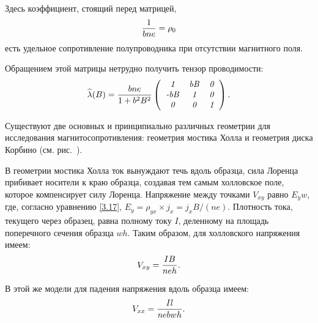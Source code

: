 Здесь коэффициент, стоящий перед матрицей,
\begin{equation}
	\frac{1}{bne} = \rho_0
	\eqmark{UdSoprot}
\end{equation}
есть удельное сопротивление полупроводника при отсутствии магнитного поля.

Обращением этой матрицы нетрудно получить тензор проводимости:
\begin{equation}
	\widehat{\lambda}(B)=\frac{bne}{1+b^2B^2}\left(
	\begin{tabular}{ccc}
		{\it 1} & {\it bB} & {\it 0} \\
		{\it -bB} &{\it 1}& {\it 0} \\
		{\it 0} &{\it 0}& {\it 1}\\
	\end{tabular}
	\right).
	\eqmark{3.18}
\end{equation}

Существуют две основных и принципиально различных геометрии для исследования магнитосопротивления: геометрия
мостика Холла и геометрия диска Корбино (см. рис.~).

В геометрии мостика Холла ток вынуждают течь вдоль образца, сила Лоренца прибивает носители к краю образца, создавая тем самым холловское поле, которое компенсирует силу Лоренца. Напряжение между точками $V_{xy}$ равно $E_yw$, где, согласно уравнению \eqref{3.17}, $E_y=\rho_{yx}\times j_x=j_x B/(ne)$. Плотность тока, текущего через образец, равна полному току $I$, деленному на площадь поперечного сечения образца $wh$. Таким образом, для холловского напряжения имеем:
\begin{equation}
	V_{xy}=\frac{IB}{neh}.
	\eqmark{3.19}
\end{equation}

В этой же модели для падения напряжения вдоль образца имеем:
\begin{equation}
	V_{xx}=\frac{Il}{nebwh}.
	\eqmark{3.20}
\end{equation}

